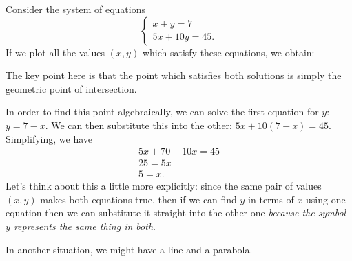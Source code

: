 \begin{ex}
  Consider the system of equations
  \begin{displaymath}
    \begin{cases}
      x + y = 7\\
      5x + 10y = 45.
    \end{cases}
  \end{displaymath}
  If we plot all the values $ (x,y) $ which satisfy these equations, we obtain:
  \begin{center}
  \end{center}
  The key point here is that the point which satisfies both solutions is simply the geometric point of intersection.

  In order to find this point algebraically, we can solve the first equation for $ y $: $ y = 7 - x $. We can then
  substitute this into the other: $ 5x + 10(7 - x) = 45 $. Simplifying, we have
  \begin{gather*}
    5x + 70 - 10x = 45\\
    25 = 5x\\
    5 = x.
  \end{gather*}
  Let's think about this a little more explicitly: since the same pair of values $ (x,y) $ makes both equations
  true, then if we can find $ y $ in terms of $ x $ using one equation then we can substitute it straight into
  the other one \emph{because the symbol $ y $ represents the same thing in both}.
\end{ex}

In another situation, we might have a line and a parabola.

